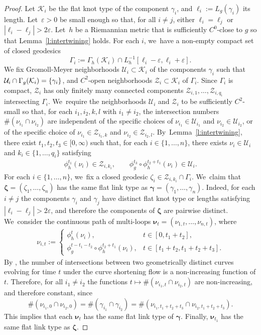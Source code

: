 \documentclass[11pt]{article}
\let\epsilon\varepsilon
\let\bm\boldsymbol
\newcommand{\KK}{\mathcal{K}}
\newcommand{\UU}{\mathcal{U}}
\newcommand{\ZZ}{\mathcal{Z}}
\theoremstyle{plain}
\theoremstyle{definition}
\begin{document}
\begin{proof}
Let $\KK_i$ be the flat knot type of the component $\gamma_i$, and $\ell_i:=L_g(\gamma_i)$ its length. Let~$\epsilon>0$ be small enough so that, for all $i\neq j$, either $\ell_i=\ell_j$ or $|\ell_i-\ell_j|>2\epsilon$. Let~$h$ be a Riemannian metric that is sufficiently $C^0$-close to $g$ so that Lemma~\ref{l:intertwining} holds. For each $i$, we~have a non-empty compact set of closed geodesics
\[
\Gamma_i:=\Gamma_h(\KK_i)\cap L_h^{-1}[\ell_i-\epsilon,\ell_i+\epsilon].
\]
We fix Gromoll-Meyer neighborhoods $\UU_i\subset\KK_i$ of the components $\gamma_i$ such that $\UU_i\cap\nobreak\Gamma_g(\KK_i)=\{\gamma_i\}$, and $C^2$-open neighborhoods $\ZZ_{i}\subset\KK_i$ of $\Gamma_i$.
Since $\Gamma_i$ is compact, $\ZZ_i$ has only finitely many connected components $\ZZ_{i,1},\dots,\ZZ_{i,q_i}$ intersecting $\Gamma_i$. We~require the neighborhoods $\UU_i$ and $\ZZ_i$ to be sufficiently $C^2$-small so that, for each $i_1,i_2,k,l$ with $i_1\neq i_2$, the intersection numbers $\#(\nu_{i_1}\cap\nu_{i_2})$ are independent of the specific choices of $\nu_{i_1}\in\UU_{i_1}$ and $\nu_{i_2}\in\UU_{i_2}$, or of the specific choice of $\nu_{i_1}\in\ZZ_{i_1,k}$ and $\nu_{i_2}\in\ZZ_{i_2,l}$. By~Lemma~\ref{l:intertwining}, there exist $t_1,t_2,t_3\in[0,\infty)$ such that, for each $i\in\{1,\dots,n\}$, there exists $\nu_i\in\UU_i$ and $k_i\in\{1,\dots,q_i\}$ satisfying
\begin{align*}
\phi_h^{t_1}(\nu_i)\in\ZZ_{i,k_i},
\qquad
\phi_g^{t_3}\circ\phi_h^{t_2+t_1}(\nu_i)\in\UU_i.
\end{align*}
For each $i\in\{1,\dots,n\}$, we~fix a closed geodesic $\zeta_i\in \ZZ_{i,k_i}\cap\Gamma_i$. We~claim that $\bm\zeta=(\zeta_{1},\dots,\zeta_{n})$ has the same flat link type as $\bm\gamma=(\gamma_1,\dots,\gamma_n)$. Indeed, for each $i\neq j$ the components $\gamma_i$ and $\gamma_j$ have distinct flat knot type or lengths satisfying $|\ell_i-\ell_j|>2\epsilon$, and therefore the components of $\bm\zeta$ are pairwise distinct. We~consider the continuous path of multi-loops $\bm\nu_t=(\nu_{1,t},\dots,\nu_{n,t})$, where
\begin{align*}
\nu_{i,t}
:=
\begin{cases}
\phi_h^t(\nu_i), & t\in[0,t_1+t_2],  \\
\phi_g^{t-t_1-t_2}\circ\phi_h^{t_2+t_1}(\nu_i), & t\in[t_1+t_2,t_1+t_2+t_3].
\end{cases}
\end{align*}
By \cite[Lem.\,3.3]{Angenent:2005aa}, the number of intersections between two geometrically distinct curves evolving for time $t$ under the curve shortening flow is a non-increasing function of $t$. Therefore, for all $i_1\neq i_2$ the functions $t\mapsto\#(\nu_{i_1,t}\cap\nu_{i_2,t})$ are non-increasing, and therefore constant, since
\[
\#(\nu_{i_1,0}\cap\nu_{i_2,0})
=
\#(\gamma_{i_1}\cap\gamma_{i_2})
=
\#(\nu_{i_1,t_1+t_2+t_3}\cap\nu_{i_2,t_1+t_2+t_3}).
\]
This implies that each $\bm\nu_t$ has the same flat link type of $\bm\gamma$. Finally, $\bm\nu_{t_1}$ has the same flat link type as $\bm\zeta$.
\end{proof}
\end{document}
